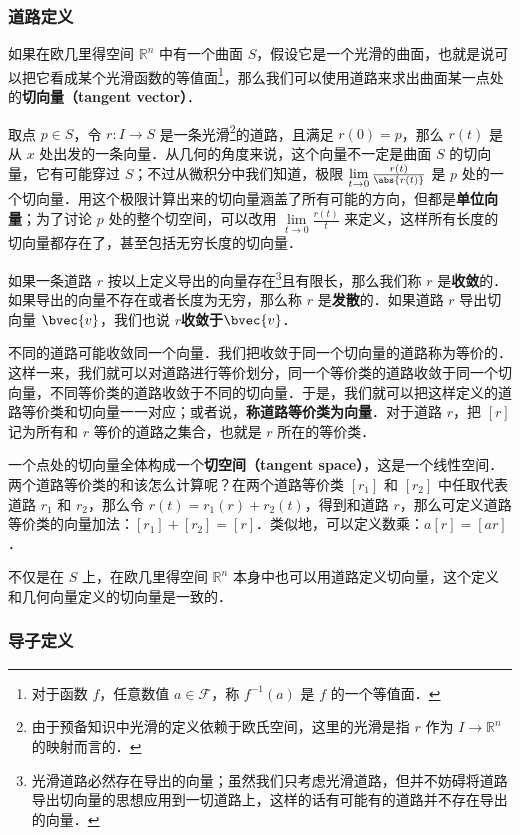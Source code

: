 \subsubsection{道路定义}

如果在欧几里得空间 $\mathbb{R}^n$ 中有一个曲面 $S$，假设它是一个光滑的曲面，也就是说可以把它看成某个光滑函数的等值面\footnote{对于函数 $f$，任意数值 $a\in\mathcal{F}$，称 $f^{-1}(a)$ 是 $f$ 的一个等值面．}，那么我们可以使用道路来求出曲面某一点处的\textbf{切向量（tangent vector）}．

取点 $p\in S$，令 $r:I\rightarrow S$ 是一条光滑\footnote{由于预备知识中光滑的定义依赖于欧氏空间，这里的光滑是指 $r$ 作为 $I\rightarrow\mathbb{R}^n$ 的映射而言的．}的道路，且满足 $r(0)=p$，那么 $r(t)$ 是从 $x$ 处出发的一条向量．从几何的角度来说，这个向量不一定是曲面 $S$ 的切向量，它有可能穿过 $S$；不过从微积分中我们知道，极限 $\lim\limits_{t\rightarrow 0}\frac{r(t)}{\abs{r(t)}}$ 是 $p$ 处的一个切向量．用这个极限计算出来的切向量涵盖了所有可能的方向，但都是\textbf{单位向量}；为了讨论 $p$ 处的整个切空间，可以改用 $\lim\limits_{t\rightarrow 0}\frac{r(t)}{t}$ 来定义，这样所有长度的切向量都存在了，甚至包括无穷长度的切向量．

如果一条道路 $r$ 按以上定义导出的向量存在\footnote{光滑道路必然存在导出的向量；虽然我们只考虑光滑道路，但并不妨碍将道路导出切向量的思想应用到一切道路上，这样的话有可能有的道路并不存在导出的向量．}且有限长，那么我们称 $r$ 是\textbf{收敛}的．如果导出的向量不存在或者长度为无穷，那么称 $r$ 是\textbf{发散}的．如果道路 $r$ 导出切向量 $\bvec{v}$，我们也说 $r$\textbf{收敛于}$\bvec{v}$．

不同的道路可能收敛同一个向量．我们把收敛于同一个切向量的道路称为等价的．这样一来，我们就可以对道路进行等价划分，同一个等价类的道路收敛于同一个切向量，不同等价类的道路收敛于不同的切向量．于是，我们就可以把这样定义的道路等价类和切向量一一对应；或者说，\textbf{称道路等价类为向量}．对于道路 $r$，把 $[r]$ 记为所有和 $r$ 等价的道路之集合，也就是 $r$ 所在的等价类．

一个点处的切向量全体构成一个\textbf{切空间（tangent space）}，这是一个线性空间．两个道路等价类的和该怎么计算呢？在两个道路等价类 $[r_1]$ 和 $[r_2]$ 中任取代表道路 $r_1$ 和 $r_2$，那么令 $r(t)=r_1(r)+r_2(t)$，得到和道路 $r$，那么可定义道路等价类的向量加法：$[r_1]+[r_2]=[r]$．类似地，可以定义数乘：$a[r]=[ar]$．

不仅是在 $S$ 上，在欧几里得空间 $\mathbb{R}^n$ 本身中也可以用道路定义切向量，这个定义和几何向量定义的切向量是一致的．

\subsubsection{导子定义}


